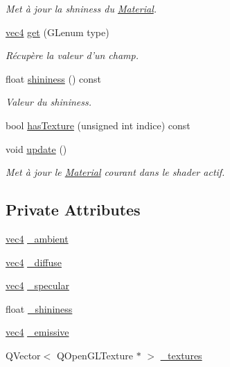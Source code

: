 \begin{DoxyCompactItemize}
\begin{DoxyCompactList}\small\item\em Met à jour la shniness du \hyperlink{class_material}{Material}. \end{DoxyCompactList}\item 
\hyperlink{structvec4}{vec4} \hyperlink{class_material_a87434a8797bb6e758d764a4d7350ac38}{get} (G\+Lenum type)
\begin{DoxyCompactList}\small\item\em Récupère la valeur d'un champ. \end{DoxyCompactList}\item 
float \hyperlink{class_material_a9a938aa96f0d5a5dc4d17d43cfd4b42b}{shininess} () const 
\begin{DoxyCompactList}\small\item\em Valeur du shininess. \end{DoxyCompactList}\item 
bool \hyperlink{class_material_afa706ac6c8b21153d0742222bf3372fa}{has\+Texture} (unsigned int indice) const 
\item 
void \hyperlink{class_material_a3f43fe7bcfa721fd8156adb151adf45c}{update} ()
\begin{DoxyCompactList}\small\item\em Met à jour le \hyperlink{class_material}{Material} courant dans le shader actif. \end{DoxyCompactList}\end{DoxyCompactItemize}
\subsection*{Private Attributes}
\begin{DoxyCompactItemize}
\item 
\hyperlink{structvec4}{vec4} \hyperlink{class_material_a8631fe4ccaea32b5f83d618490ed1a94}{\+\_\+ambient}
\item 
\hyperlink{structvec4}{vec4} \hyperlink{class_material_ac6d5a21fb938c37d981ff904baa139ce}{\+\_\+diffuse}
\item 
\hyperlink{structvec4}{vec4} \hyperlink{class_material_aa86eef19901a701e22ef3ddd7b9c8ec2}{\+\_\+specular}
\item 
float \hyperlink{class_material_ae3f666b9de93b770232ebb5b1b3ee47e}{\+\_\+shininess}
\item 
\hyperlink{structvec4}{vec4} \hyperlink{class_material_a48f498add75d2e7b0022b3f34271e22b}{\+\_\+emissive}
\item 
Q\+Vector$<$ Q\+Open\+G\+L\+Texture $\ast$ $>$ \hyperlink{class_material_a0cccab80c654d9506bd1fff36ee47bd6}{\+\_\+textures}
\end{DoxyCompactItemize}
